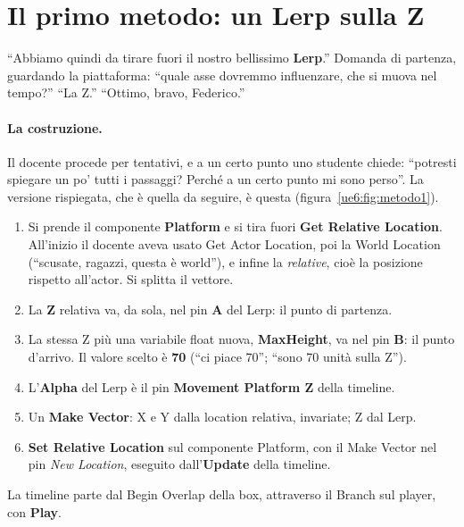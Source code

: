 \section{Il primo metodo: un Lerp sulla Z}
\label{ue6:sec:metodo1}

``Abbiamo quindi da tirare fuori il nostro bellissimo \textbf{Lerp}.'' Domanda di
partenza, guardando la piattaforma: ``quale asse dovremmo influenzare, che si muova nel
tempo?'' ``La Z.'' ``Ottimo, bravo, Federico.''

\paragraph{La costruzione.} Il docente procede per tentativi, e a un certo punto uno
studente chiede: ``potresti spiegare un po' tutti i passaggi? Perché a un certo punto mi
sono perso''. La versione rispiegata, che è quella da seguire, è questa
(figura~\ref{ue6:fig:metodo1}).
\begin{enumerate}
  \item Si prende il componente \textbf{Platform} e si tira fuori \textbf{Get Relative
        Location}. All'inizio il docente aveva usato Get Actor Location, poi la World
        Location (``scusate, ragazzi, questa è world''), e infine la \emph{relative},
        cioè la posizione rispetto all'actor. Si splitta il vettore.
  \item La \textbf{Z} relativa va, da sola, nel pin \textbf{A} del Lerp: il punto di
        partenza.
  \item La stessa Z più una variabile float nuova, \textbf{MaxHeight}, va nel pin
        \textbf{B}: il punto d'arrivo. Il valore scelto è \textbf{70} (``ci piace 70'';
        ``sono 70 unità sulla Z'').
  \item L'\textbf{Alpha} del Lerp è il pin \textbf{Movement Platform Z} della timeline.
  \item Un \textbf{Make Vector}: X e Y dalla location relativa, invariate; Z dal Lerp.
  \item \textbf{Set Relative Location} sul componente Platform, con il Make Vector nel
        pin \emph{New Location}, eseguito dall'\textbf{Update} della timeline.
\end{enumerate}
La timeline parte dal Begin Overlap della box, attraverso il Branch sul player, con
\textbf{Play}.


